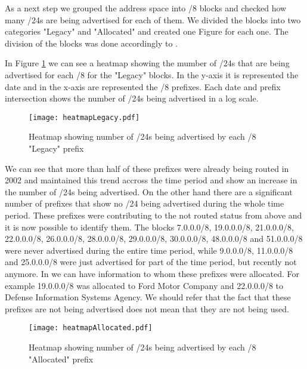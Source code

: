 \documentclass[11pt,a4paper]{scrreprt}
\begin{document}
As a next step we grouped the address space into /8 blocks and checked how many /24s are being advertised for each of them. We divided the blocks into two categories "Legacy" and "Allocated" and created one Figure for each one. The division of the blocks was done accordingly to \cite{IANA_Address_Space}.

In Figure \ref{fig:heatmapLegacy} we can see a heatmap showing the mumber of /24s that are being advertised for each /8 for the "Legacy" blocks. In the y-axis it is represented the date and in the x-axis are represented the /8 prefixes.  Each date and prefix intersection shows the number of /24s being advertised in a log scale. 

\begin{figure}[!h]
\centering
\texttt{[image: heatmapLegacy.pdf]}
\caption{Heatmap showing number of /24s being advertised by each /8 "Legacy" prefix}
\label{fig:heatmapLegacy}
\end{figure}

We can see that more than half of these prefixes were already being routed in 2002 and maintained this trend accross the time period and show an increase in the number of /24s being advertised. On the other hand there are a significant number of prefixes that show no /24 being advertised during the whole time period. These prefixes were contributing to the not routed status from above and it is now possible to identify them. The blocks 7.0.0.0/8, 19.0.0.0/8, 21.0.0.0/8, 22.0.0.0/8, 26.0.0.0/8, 28.0.0.0/8, 29.0.0.0/8, 30.0.0.0/8, 48.0.0.0/8 and 51.0.0.0/8 were never advertised during the entire time period, while 9.0.0.0/8, 11.0.0.0/8 and 25.0.0.0/8 were just advertised for part of the time period, but recently not anymore. In \cite{IANA_Address_Space} we can have information to whom these prefixes were allocated. For example 19.0.0.0/8 was allocated to Ford Motor Company and 22.0.0.0/8 to Defense Information Systems Agency. We should refer that the fact that these prefixes are not being advertised does not mean that they are not being used.  

\begin{figure}[!h]
\centering
\texttt{[image: heatmapAllocated.pdf]}
\caption{Heatmap showing number of /24s being advertised by each /8 "Allocated" prefix}
\label{fig:heatmapAllocated}
\end{figure}
\end{document}
